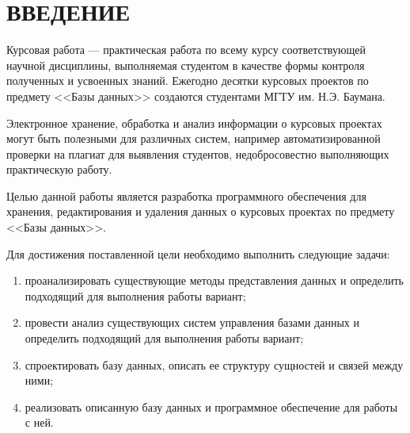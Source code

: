 \newpage
\chapter*{ВВЕДЕНИЕ}

Курсовая работа\cite{coursework} --- практическая работа по всему курсу соответствующей научной дисциплины, выполняемая студентом в качестве формы контроля полученных и усвоенных знаний. Ежегодно десятки курсовых проектов по предмету <<Базы данных>> создаются студентами МГТУ им. Н.Э. Баумана.

Электронное хранение, обработка и анализ информации о курсовых проектах могут быть полезными для различных систем, например автоматизированной проверки на плагиат для выявления студентов, недобросовестно выполняющих практическую работу.


Целью данной работы является разработка программного обеспечения для хранения, редактирования и удаления данных о курсовых проектах по предмету <<Базы данных>>.

Для достижения поставленной цели необходимо выполнить следующие задачи:
\begin{enumerate}
	\item проанализировать существующие методы представления данных и определить подходящий для выполнения работы вариант;
	\item провести анализ существующих систем управления базами данных и определить подходящий для выполнения работы вариант;
	\item спроектировать базу данных, описать ее структуру сущностей и связей между ними;
	\item реализовать описанную базу данных и программное обеспечение для работы с ней.
\end{enumerate}

